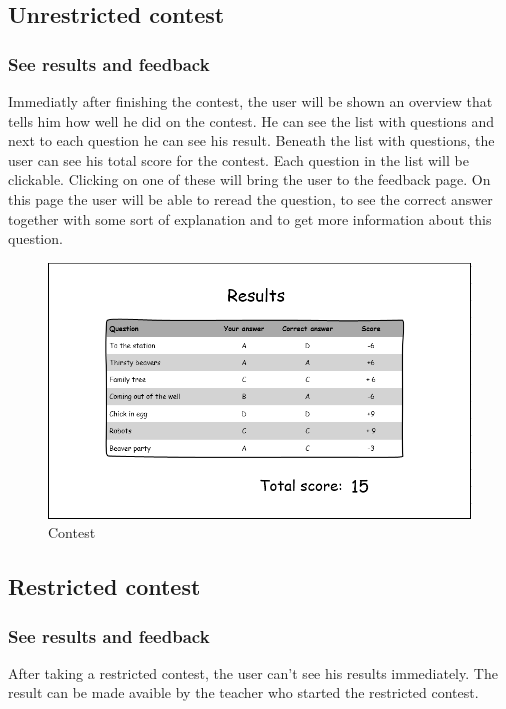 \subsection*{Unrestricted contest}

\subsubsection*{See results and feedback}
Immediatly after finishing the contest, the user will be shown an overview that tells him how well he did on the contest. He can see the list with questions and next to each question he can see his result. Beneath the list with questions, the user can see his total score for the contest. Each question in the list will be clickable. Clicking on one of these will bring the user to the feedback page. On this page the user will be able to reread the question, to see the correct answer together with some sort of explanation and to get more information about this question.  

		\begin{figure}[h]
		  \centering
			\includegraphics[width=1\textwidth]{img/results.png}
		  \caption{Contest}
		  \label{Contest}
		\end{figure}

\subsection*{Restricted contest}

\subsubsection*{See results and feedback}
After taking a restricted contest, the user can't see his results immediately. The result can be made avaible by the teacher who started the restricted contest. 

